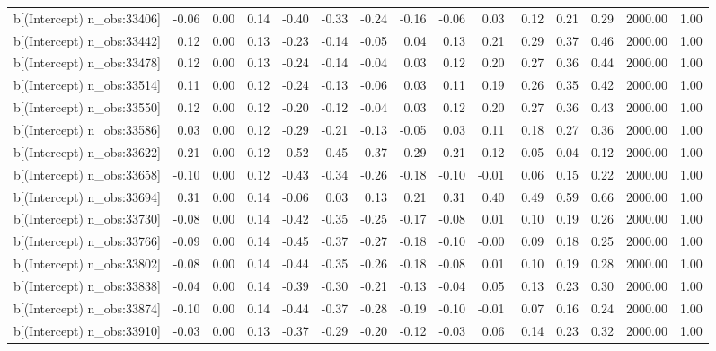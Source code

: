 \begin{table}[ht]
\begin{tabular}{rrrrrrrrrrrrrrr}
  b[(Intercept) n\_obs:33406] & -0.06 & 0.00 & 0.14 & -0.40 & -0.33 & -0.24 & -0.16 & -0.06 & 0.03 & 0.12 & 0.21 & 0.29 & 2000.00 & 1.00 \\ 
  b[(Intercept) n\_obs:33442] & 0.12 & 0.00 & 0.13 & -0.23 & -0.14 & -0.05 & 0.04 & 0.13 & 0.21 & 0.29 & 0.37 & 0.46 & 2000.00 & 1.00 \\ 
  b[(Intercept) n\_obs:33478] & 0.12 & 0.00 & 0.13 & -0.24 & -0.14 & -0.04 & 0.03 & 0.12 & 0.20 & 0.27 & 0.36 & 0.44 & 2000.00 & 1.00 \\ 
  b[(Intercept) n\_obs:33514] & 0.11 & 0.00 & 0.12 & -0.24 & -0.13 & -0.06 & 0.03 & 0.11 & 0.19 & 0.26 & 0.35 & 0.42 & 2000.00 & 1.00 \\ 
  b[(Intercept) n\_obs:33550] & 0.12 & 0.00 & 0.12 & -0.20 & -0.12 & -0.04 & 0.03 & 0.12 & 0.20 & 0.27 & 0.36 & 0.43 & 2000.00 & 1.00 \\ 
  b[(Intercept) n\_obs:33586] & 0.03 & 0.00 & 0.12 & -0.29 & -0.21 & -0.13 & -0.05 & 0.03 & 0.11 & 0.18 & 0.27 & 0.36 & 2000.00 & 1.00 \\ 
  b[(Intercept) n\_obs:33622] & -0.21 & 0.00 & 0.12 & -0.52 & -0.45 & -0.37 & -0.29 & -0.21 & -0.12 & -0.05 & 0.04 & 0.12 & 2000.00 & 1.00 \\ 
  b[(Intercept) n\_obs:33658] & -0.10 & 0.00 & 0.12 & -0.43 & -0.34 & -0.26 & -0.18 & -0.10 & -0.01 & 0.06 & 0.15 & 0.22 & 2000.00 & 1.00 \\ 
  b[(Intercept) n\_obs:33694] & 0.31 & 0.00 & 0.14 & -0.06 & 0.03 & 0.13 & 0.21 & 0.31 & 0.40 & 0.49 & 0.59 & 0.66 & 2000.00 & 1.00 \\ 
  b[(Intercept) n\_obs:33730] & -0.08 & 0.00 & 0.14 & -0.42 & -0.35 & -0.25 & -0.17 & -0.08 & 0.01 & 0.10 & 0.19 & 0.26 & 2000.00 & 1.00 \\ 
  b[(Intercept) n\_obs:33766] & -0.09 & 0.00 & 0.14 & -0.45 & -0.37 & -0.27 & -0.18 & -0.10 & -0.00 & 0.09 & 0.18 & 0.25 & 2000.00 & 1.00 \\ 
  b[(Intercept) n\_obs:33802] & -0.08 & 0.00 & 0.14 & -0.44 & -0.35 & -0.26 & -0.18 & -0.08 & 0.01 & 0.10 & 0.19 & 0.28 & 2000.00 & 1.00 \\ 
  b[(Intercept) n\_obs:33838] & -0.04 & 0.00 & 0.14 & -0.39 & -0.30 & -0.21 & -0.13 & -0.04 & 0.05 & 0.13 & 0.23 & 0.30 & 2000.00 & 1.00 \\ 
  b[(Intercept) n\_obs:33874] & -0.10 & 0.00 & 0.14 & -0.44 & -0.37 & -0.28 & -0.19 & -0.10 & -0.01 & 0.07 & 0.16 & 0.24 & 2000.00 & 1.00 \\ 
  b[(Intercept) n\_obs:33910] & -0.03 & 0.00 & 0.13 & -0.37 & -0.29 & -0.20 & -0.12 & -0.03 & 0.06 & 0.14 & 0.23 & 0.32 & 2000.00 & 1.00 \\ 

\end{tabular}
\end{table}
